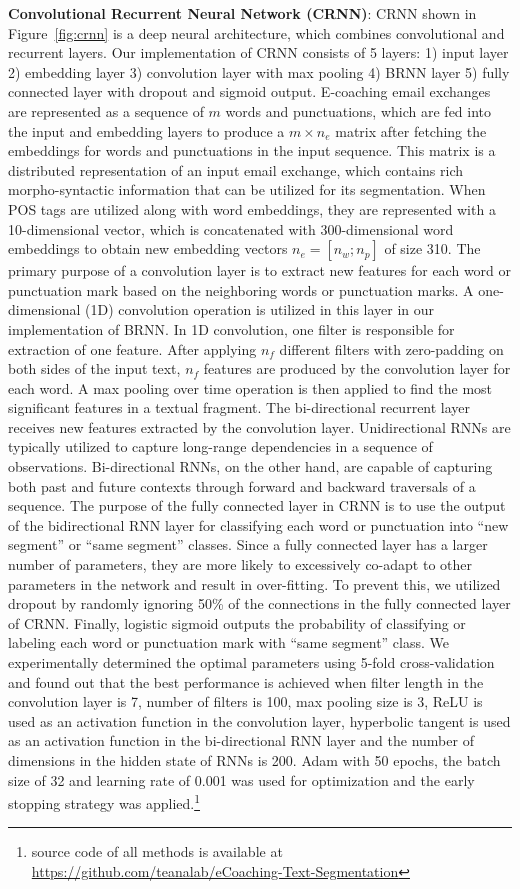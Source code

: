 \documentclass{amia}
\begin{document}
\textbf{Convolutional Recurrent Neural Network (CRNN)}: CRNN \cite{treviso2017sentence} shown in Figure~\ref{fig:crnn} is a deep neural architecture, which combines convolutional and recurrent layers. Our implementation of CRNN consists of 5 layers: 1) input layer 2) embedding layer 3) convolution layer with max pooling 4) BRNN layer 5) fully connected layer with dropout and sigmoid output. E-coaching email exchanges are represented as a sequence of $m$ words and punctuations, which are fed into the input and embedding layers to produce a $m \times n_e$ matrix after fetching the embeddings for words and punctuations in the input sequence. This matrix is a distributed representation of an input email exchange, which contains rich morpho-syntactic information that can be utilized for its segmentation. When POS tags are utilized along with word embeddings, they are represented with a 10-dimensional vector, which is concatenated with 300-dimensional word embeddings to obtain new embedding vectors $n_e = [n_w;n_p]$ of size 310. The primary purpose of a convolution layer is to extract new features for each word or punctuation mark based on the neighboring words or punctuation marks. A one-dimensional (1D) convolution operation is utilized in this layer in our implementation of BRNN. In 1D convolution, one filter is responsible for extraction of one feature. After applying $n_f$ different filters with zero-padding on both sides of the input text, $n_f$ features are produced by the convolution layer for each word. A max pooling over time operation is then applied to find the most significant features in a textual fragment. The bi-directional recurrent layer receives new features extracted by the convolution layer. Unidirectional RNNs are typically utilized to capture long-range dependencies in a sequence of observations. Bi-directional RNNs, on the other hand, are capable of capturing both past and future contexts through forward and backward traversals of a sequence. The purpose of the fully connected layer in CRNN is to use the output of the bidirectional RNN layer for classifying each word or punctuation into ``new segment'' or ``same segment'' classes. Since a fully connected layer has a larger number of parameters, they are more likely to excessively co-adapt to other parameters in the network and result in over-fitting. To prevent this, we utilized dropout by randomly ignoring 50\% of the connections in the fully connected layer of CRNN. Finally, logistic sigmoid outputs the probability of classifying or labeling each word or punctuation mark with ``same segment'' class. We experimentally determined the optimal parameters using 5-fold cross-validation and found out that the best performance is achieved when filter length in the convolution layer is 7, number of filters is 100, max pooling size is 3, ReLU is used as an activation function in the convolution layer, hyperbolic tangent is used as an activation function in the bi-directional RNN layer and the number of dimensions in the hidden state of RNNs is 200. Adam\cite{kingma2014adam} with 50 epochs, the batch size of 32 and learning rate of 0.001 was used for optimization and the early stopping strategy was applied.\footnote{source code of all methods is available at \url{https://github.com/teanalab/eCoaching-Text-Segmentation}}
\end{document}
